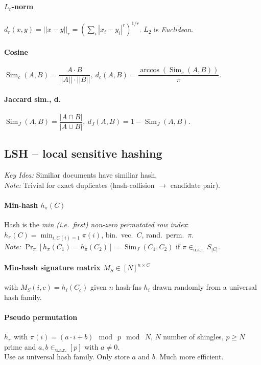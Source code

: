\documentclass[9pt]{scrartcl}
\DeclareMathOperator{\Sim}{Sim}
\newcommand{\inuar}{\in_{\text{u.a.r.}}}
\begin{document}
\begin{twocolumn}
\paragraph{$L_r$-norm}
$d_r(x,y) = ||x-y||_r = (\sum_i |x_i - y_i|^r)^{1/r}$. $L_2$ is \emph{Euclidean}.
\paragraph{Cosine}
$\Sim_c(A,B) = \dfrac{A \cdot B}{||A||\cdot||B||},\ d_c(A,B) = \dfrac{\arccos(\Sim_c(A,B))}{\pi}.$
\paragraph{Jaccard sim., d.}
$\Sim_J(A,B) = \dfrac{|A \cap B|}{|A \cup B|},\ d_J(A,B) = 1 - \Sim_J(A,B).$

\subsection{LSH -- local sensitive hashing}
\emph{Key Idea:} Similiar documents have similiar hash. \\
\emph{Note:} Trivial for exact duplicates (hash-collision $\rightarrow$ candidate pair).
\paragraph{Min-hash $h_\pi(C)$}
Hash is the \emph{min (i.e.\ first) non-zero permutated row index}: $h_\pi(C) = \min_{i, C(i) = 1} \pi(i)$,
bin.\ vec.\ $C$, rand.\ perm.\ $\pi$. \\
\emph{Note:} $\Pr_\pi[h_\pi(C_1) = h_\pi(C_2)] = \Sim_J(C_1,C_2)$ if $\pi \inuar S_{|C|}$.
\paragraph{Min-hash signature matrix $M_S \in [N]^{n\times C}$}
with $M_S(i,c) = h_i(C_c)$
given $n$ hash-fns $h_i$ drawn randomly from a universal hash family.

\paragraph{Pseudo permutation}
$h_\pi$ with $\pi(i) = (a\cdot i + b) \mod\ p \mod\ N$, $N$ number of shingles, $p\geq N$ prime and $a,b \inuar [p]$ with $a \neq 0$. \\
Use as universal hash family. Only store $a$ and $b$. Much more efficient.


\end{twocolumn}
\end{document}
